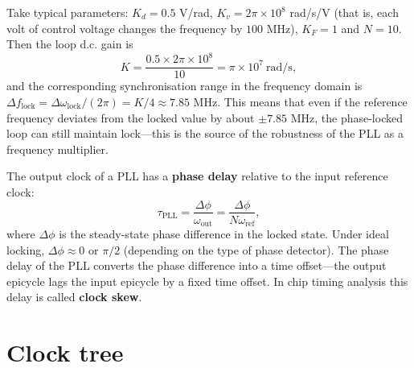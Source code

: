 \begin{remark}\label{ch24_pll_lock_range_example}
Take typical parameters: $K_d = 0.5$ V/rad, $K_v = 2\pi\times 10^8$ rad/s/V (that is, each volt of control voltage changes the frequency by $100$ MHz), $K_F = 1$ and $N = 10$. Then the loop d.c. gain is
\[
K = \frac{0.5 \times 2\pi\times 10^8}{10} = \pi\times 10^7\ \text{rad/s},
\]
and the corresponding synchronisation range in the frequency domain is $\Delta f_{\text{lock}} = \Delta\omega_{\text{lock}}/(2\pi) = K/4 \approx 7.85$ MHz. This means that even if the reference frequency deviates from the locked value by about $\pm 7.85$ MHz, the phase-locked loop can still maintain lock---this is the source of the robustness of the PLL as a frequency multiplier.
\end{remark}

\begin{definition}\label{def:pll_delay}
The output clock of a PLL has a \textbf{phase delay} relative to the input reference clock:
\[
\tau_{\text{PLL}} = \frac{\Delta\phi}{\omega_{\text{out}}} = \frac{\Delta\phi}{N\omega_{\text{ref}}},
\]
where $\Delta\phi$ is the steady-state phase difference in the locked state. Under ideal locking, $\Delta\phi \approx 0$ or $\pi/2$ (depending on the type of phase detector). The phase delay of the PLL converts the phase difference into a time offset---the output epicycle lags the input epicycle by a fixed time offset. In chip timing analysis this delay is called \textbf{clock skew}.
\end{definition}

\section{Clock tree}

